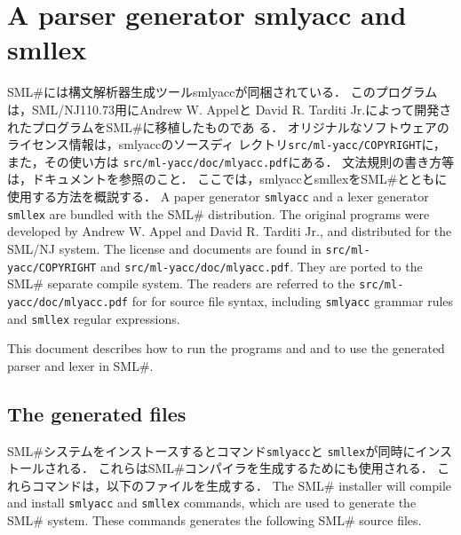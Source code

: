\documentclass{jbook}
\newcommand{\txt}[2]{#2}
\newcommand{\smlsharp}{SML\#}
\newcommand{\code}[1]{\mbox{\large\tt #1}}
\begin{document}
\chapter{\txt{構文解析器生成ツール smlyaccとsmllex}{A parser generator smlyacc and smllex}}
\ifjp%
	\smlsharp{}には構文解析器生成ツールsmlyaccが同梱されている．
	このプログラムは，SML/NJ110.73用にAndrew W. Appelと
David R. Tarditi Jr.によって開発されたプログラムを\smlsharp{}に移植したものであ
る． 
	オリジナルなソフトウェアのライセンス情報は，smlyaccのソースディ
レクトリ\code{src/ml-yacc/COPYRIGHT}に，また，その使い方は
\code{src/ml-yacc/doc/mlyacc.pdf}にある．
	文法規則の書き方等は，ドキュメントを参照のこと．
	ここでは，smlyaccとsmllexを\smlsharp{}とともに使用する方法を概説する．
\else%
	A paper generator \code{smlyacc} and a lexer generator
\code{smllex} are bundled with the \smlsharp{} distribution.
	The original programs were developed by Andrew W. Appel and 
David R. Tarditi Jr., and distributed for the SML/NJ system.
	The license and documents are found in
\code{src/ml-yacc/COPYRIGHT} and \code{src/ml-yacc/doc/mlyacc.pdf}.
	They are ported to the \smlsharp{} separate compile system.
	The readers are referred to the
\code{src/ml-yacc/doc/mlyacc.pdf} for for source file syntax, including
\code{smlyacc} grammar rules and \code{smllex} regular expressions.

	This document describes how to run the programs and and to use
the generated parser and lexer in \smlsharp{}.
\fi%

\section{\txt{生成されるソースファイル}{The generated files}}

\ifjp%
	\smlsharp{}システムをインストースするとコマンド\code{smlyacc}と
\code{smllex}が同時にインストールされる．
	これらは\smlsharp{}コンパイラを生成するためにも使用される．
	これらコマンドは，以下のファイルを生成する．
\else%
	The \smlsharp{} installer will compile and install 
\code{smlyacc}
and
\code{smllex}
commands, which are used to generate the \smlsharp{} system.
	These commands generates the following \smlsharp{} source files.
\fi%
\end{document}
